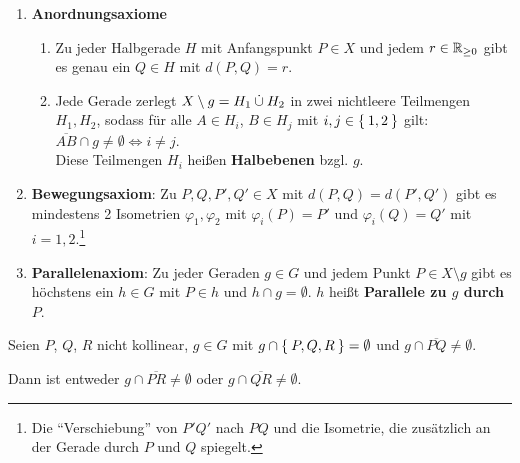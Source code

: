 \begin{definition}%
    \begin{enumerate}[label=§\arabic*),ref=§\arabic*,start=3]
        \item \label{axiom:3}\textbf{Anordnungsaxiome}
            \begin{enumerate}[label=(\roman*),ref=\theenumi{} (\roman*)]
                \item \label{axiom:3.1} Zu jeder
                      Halbgerade $H$ mit Anfangspunkt $P \in X$ und jedem
                      $r \in \mathbb{R}_{\geq 0}$ gibt es genau ein
                      $Q \in H$ mit $d(P,Q) = r$.
                \item \label{axiom:3.2} Jede Gerade zerlegt
                      $X \setminus g = H_1 \mathbin{\dot{\cup}} H_2$ in zwei
                      nichtleere Teilmengen $H_1, H_2$,
                      sodass für alle $A \in H_i$, $B \in H_j$ mit
                      $i,j \in \Set{1,2}$ gilt:
                      $\overline{AB} \cap g \neq \emptyset \Leftrightarrow i \neq j$.\\
                      Diese Teilmengen $H_i$ heißen
                      \textbf{Halbebenen} bzgl.
                      $g$.
            \end{enumerate}
        \item \label{axiom:4}\textbf{Bewegungsaxiom}:
            Zu $P, Q, P', Q' \in X$
            mit $d(P,Q) = d(P', Q')$ gibt es mindestens 2 Isometrien $\varphi_1, \varphi_2$
            mit $\varphi_i (P) = P'$ und $\varphi_i(Q) = Q'$ mit $i=1,2$.\footnote{Die \enquote{Verschiebung} von $P'Q'$ nach $PQ$ und die Isometrie, die zusätzlich an der Gerade durch $P$ und $Q$ spiegelt.}
        \item \label{axiom:5}\textbf{Parallelenaxiom}:
            Zu jeder Geraden $g \in G$ und jedem Punkt
            $P \in X \setminus g$ gibt es höchstens ein $h \in G$ mit $P \in h$ und
            $h \cap g = \emptyset$. $h$ heißt \textbf{Parallele zu $g$ durch $P$}.
    \end{enumerate}
\end{definition}

\begin{satz}\label{satz:pasch} %
    Seien $P$, $Q$, $R$ nicht kollinear, $g \in G$ mit $g \cap \Set{P, Q, R} = \emptyset$
    und $g \cap \overline{PQ} \neq \emptyset$.

    Dann ist entweder $g \cap \overline{PR} \neq \emptyset$ oder
                      $g \cap \overline{QR} \neq \emptyset$.
\end{satz}

